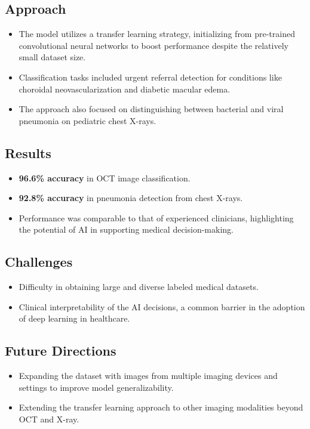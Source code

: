\subsection*{Approach}
\begin{itemize}
    \item The model utilizes a transfer learning strategy, initializing from pre-trained convolutional neural networks to boost performance despite the relatively small dataset size.
    \item Classification tasks included urgent referral detection for conditions like choroidal neovascularization and diabetic macular edema.
    \item The approach also focused on distinguishing between bacterial and viral pneumonia on pediatric chest X-rays.
\end{itemize}

\subsection*{Results}
\begin{itemize}
    \item \textbf{96.6\% accuracy} in OCT image classification.
    \item \textbf{92.8\% accuracy} in pneumonia detection from chest X-rays.
    \item Performance was comparable to that of experienced clinicians, highlighting the potential of AI in supporting medical decision-making.
\end{itemize}

\subsection*{Challenges}
\begin{itemize}
    \item Difficulty in obtaining large and diverse labeled medical datasets.
    \item Clinical interpretability of the AI decisions, a common barrier in the adoption of deep learning in healthcare.
\end{itemize}

\subsection*{Future Directions}
\begin{itemize}
    \item Expanding the dataset with images from multiple imaging devices and settings to improve model generalizability.
    \item Extending the transfer learning approach to other imaging modalities beyond OCT and X-ray.
\end{itemize}


